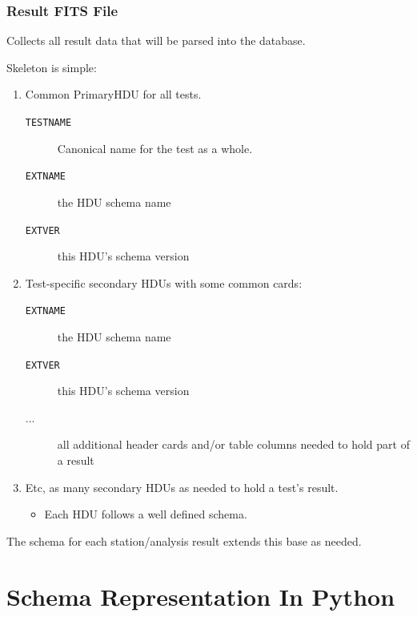 \documentclass[xcolor=dvipsnames]{beamer}
\begin{document}
\begin{frame}
  \frametitle{Result FITS File}
  Collects all result data that will be parsed into the database.

  \vspace{2mm}

  Skeleton is simple:
  \begin{enumerate}
  \item Common PrimaryHDU for all tests.
    \begin{description}
    \item[\texttt{TESTNAME}] Canonical name for the test as a whole.
    \item[\texttt{EXTNAME}] the HDU schema name
    \item[\texttt{EXTVER}] this HDU's schema version
    \end{description}
  \item Test-specific secondary HDUs with some common cards:
    \begin{description}
    \item[\texttt{EXTNAME}] the HDU schema name
    \item[\texttt{EXTVER}] this HDU's schema version
    \item[...] all additional header cards and/or table columns needed
      to hold part of a result
    \end{description}
  \item Etc, as many secondary HDUs as needed to hold a test's result. 
    \begin{itemize}
    \item Each HDU follows a well defined schema.
    \end{itemize}
  \end{enumerate}

  The schema for each station/analysis result extends this base as
  needed.
\end{frame}



\section{Schema Representation In Python}
\end{document}
